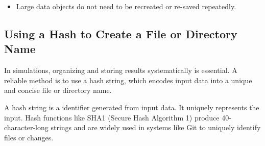 \documentclass{article}
\begin{document}
			\begin{itemize}
				\item Large data objects do not need to be recreated or re-saved repeatedly.
			\end{itemize}
			
		\subsection{Using a Hash to Create a File or Directory Name}
		
			In simulations, organizing and storing results systematically is essential. A reliable method is to use a hash string, which encodes input data into a unique and concise file or directory name. 
			
			
			A hash string is a identifier generated from input data. It uniquely represents the input. Hash functions like SHA1 (Secure Hash Algorithm 1) produce 40-character-long strings and are widely used in systems like Git to uniquely identify files or changes.
			\begin{comment}
				
			For example:
			\[
			\text{Input: "hello world"} \quad \text{Hash: 2ef7bde608ce5404e97d5f042f95f89f1c232871.}
			\]
			In simulation workflows, hash strings encode parameters (e.g., functions, arrays, objects) to create unique file or directory names.
			content...
			\end{comment}
			
\end{document}
